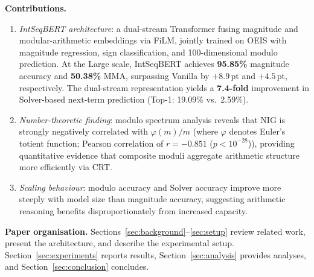 \par\smallskip
\noindent\textbf{Contributions.}
\begin{enumerate}
  \item \textit{IntSeqBERT architecture}: a dual-stream Transformer fusing magnitude and
        modular-arithmetic embeddings via FiLM, jointly trained on OEIS with magnitude
        regression, sign classification, and 100-dimensional modulo prediction. At the
        Large scale, IntSeqBERT achieves \textbf{95.85\%} magnitude accuracy and
        \textbf{50.38\%} MMA, surpassing Vanilla by $+8.9$\,pt and $+4.5$\,pt, respectively.
        The dual-stream representation yields a \textbf{7.4-fold} improvement in
        Solver-based next-term prediction (Top-1: 19.09\% vs.\ 2.59\%).

  \item \textit{Number-theoretic finding}: modulo spectrum analysis reveals that NIG is
        strongly negatively correlated with $\varphi(m)/m$ (where $\varphi$ denotes Euler's totient function; Pearson correlation of $r = {-}0.851$ ($p < 10^{-28}$)),
        providing quantitative evidence that composite moduli aggregate arithmetic structure
        more efficiently via CRT.

  \item \textit{Scaling behaviour}: modulo accuracy and Solver accuracy improve more steeply
        with model size than magnitude accuracy, suggesting arithmetic reasoning benefits
        disproportionately from increased capacity.
\end{enumerate}

\noindent\textbf{Paper organisation.}
Sections~\ref{sec:background}--\ref{sec:setup} review related work, present the architecture,
and describe the experimental setup. Section~\ref{sec:experiments} reports results, Section~\ref{sec:analysis} provides analyses, and Section~\ref{sec:conclusion} concludes.
